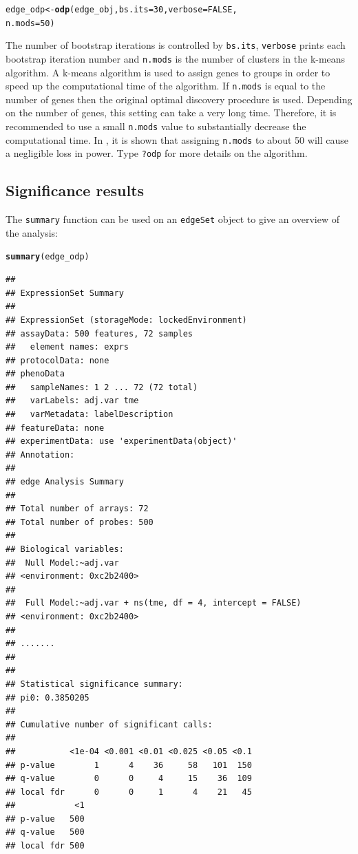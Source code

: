 \documentclass{article}\usepackage[]{graphicx}\usepackage[]{color}
\makeatletter
\newcommand{\hlnum}[1]{\textcolor[rgb]{0.686,0.059,0.569}{#1}}%
\newcommand{\hlstd}[1]{\textcolor[rgb]{0.345,0.345,0.345}{#1}}%
\newcommand{\hlkwb}[1]{\textcolor[rgb]{0.69,0.353,0.396}{#1}}%
\newcommand{\hlkwc}[1]{\textcolor[rgb]{0.333,0.667,0.333}{#1}}%
\newcommand{\hlkwd}[1]{\textcolor[rgb]{0.737,0.353,0.396}{\textbf{#1}}}%
\newenvironment{kframe}{%
 \def\at@end@of@kframe{}%
 \ifinner\ifhmode%
  \def\at@end@of@kframe{\end{minipage}}%
  \begin{minipage}{\columnwidth}%
 \fi\fi%
 \def\FrameCommand##1{\hskip\@totalleftmargin \hskip-\fboxsep
 \colorbox{shadecolor}{##1}\hskip-\fboxsep
     \hskip-\linewidth \hskip-\@totalleftmargin \hskip\columnwidth}%
 \MakeFramed {\advance\hsize-\width
   \@totalleftmargin\z@ \linewidth\hsize
   \@setminipage}}%
 {\par\unskip\endMakeFramed%
 \at@end@of@kframe}
\newenvironment{knitrout}{}{} %
\makeatother
\begin{document}
\begin{knitrout}
\color{fgcolor}\begin{kframe}
\begin{alltt}
\hlstd{edge_odp} \hlkwb{<-} \hlkwd{odp}\hlstd{(edge_obj,} \hlkwc{bs.its} \hlstd{=} \hlnum{30}\hlstd{,} \hlkwc{verbose} \hlstd{=} \hlnum{FALSE}\hlstd{,}
    \hlkwc{n.mods} \hlstd{=} \hlnum{50}\hlstd{)}
\end{alltt}
\end{kframe}
\end{knitrout}
The number of bootstrap iterations is controlled by {\tt bs.its}, {\tt verbose} prints each bootstrap iteration number and {\tt n.mods} is the number of clusters in the k-means algorithm. A k-means algorithm is used to assign genes to groups in order to speed up the computational time of the algorithm. If {\tt n.mods} is equal to the number of genes then the original optimal discovery procedure is used. Depending on the number of genes, this setting can take a very long time.  Therefore, it is recommended to use a small {\tt n.mods} value to substantially decrease the computational time. In \cite{woo:leek:storey:2011}, it is shown that assigning {\tt n.mods} to about 50 will cause a negligible loss in power. Type {\tt ?odp} for more details on the algorithm.

\subsection{Significance results}
The {\tt summary} function can be used on an {\tt edgeSet} object to give an overview of the analysis:
\begin{knitrout}
\color{fgcolor}\begin{kframe}
\begin{alltt}
\hlkwd{summary}\hlstd{(edge_odp)}
\end{alltt}
\begin{verbatim}
## 
## ExpressionSet Summary 
##  
## ExpressionSet (storageMode: lockedEnvironment)
## assayData: 500 features, 72 samples 
##   element names: exprs 
## protocolData: none
## phenoData
##   sampleNames: 1 2 ... 72 (72 total)
##   varLabels: adj.var tme
##   varMetadata: labelDescription
## featureData: none
## experimentData: use 'experimentData(object)'
## Annotation:  
## 
## edge Analysis Summary 
##  
## Total number of arrays: 72 
## Total number of probes: 500 
##  
## Biological variables: 
## 	Null Model:~adj.var
## <environment: 0xc2b2400>
## 
## 	Full Model:~adj.var + ns(tme, df = 4, intercept = FALSE)
## <environment: 0xc2b2400>
## 
## ....... 
##  
## 
## Statistical significance summary:
## pi0:	0.3850205	
## 
## Cumulative number of significant calls:
## 
##           <1e-04 <0.001 <0.01 <0.025 <0.05 <0.1
## p-value        1      4    36     58   101  150
## q-value        0      0     4     15    36  109
## local fdr      0      0     1      4    21   45
##            <1
## p-value   500
## q-value   500
## local fdr 500
\end{verbatim}
\end{kframe}
\end{knitrout}
\end{document}
